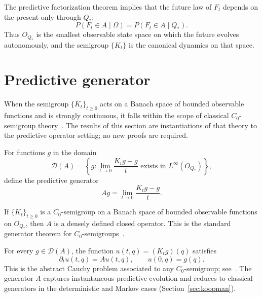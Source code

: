 \begin{remark}
The predictive factorization theorem implies that the future law of
$F_t$ depends on the present only through $Q_*$:
\[
P(F_t \in A \mid \Omega)
=
P(F_t \in A \mid Q_*).
\]
Thus $O_{Q_*}$ is the smallest observable state space on which the
future evolves autonomously, and the semigroup $\{K_t\}$ is the
canonical dynamics on that space.
\end{remark}

\section{Predictive generator}\label{sec:generator}

When the semigroup $\{K_t\}_{t\ge0}$ acts on a Banach space of bounded
observable functions and is strongly continuous, it falls within the
scope of classical $C_0$-semigroup theory~\cite{EngelNagel2000}.  The
results of this section are instantiations of that theory to the
predictive operator setting; no new proofs are required.

\begin{definition}\label{def:generator}
For functions $g$ in the domain
\[
\mathcal D(A)
=
\left\{
g :
\lim_{t\to0} \frac{K_t g - g}{t} \text{ exists in } L^\infty(O_{Q_*})
\right\},
\]
define the predictive generator
\[
A g
=
\lim_{t\to0} \frac{K_t g - g}{t}.
\]
\end{definition}

\begin{remark}\label{rem:generator-existence}
If $\{K_t\}_{t\ge0}$ is a $C_0$-semigroup on a Banach space of
bounded observable functions on $O_{Q_*}$, then $A$ is a densely
defined closed operator.  This is the standard generator theorem for
$C_0$-semigroups~\cite[Thm~II.1.4]{EngelNagel2000}.
\end{remark}

\begin{remark}\label{rem:kolmogorov}
For every $g\in\mathcal D(A)$, the function
$u(t,q) = (K_t g)(q)$
satisfies
\[
\partial_t u(t,q) = A u(t,q),
\qquad
u(0,q)=g(q).
\]
This is the abstract Cauchy problem associated to any $C_0$-semigroup;
see~\cite[Thm~II.6.7]{EngelNagel2000}.  The generator $A$ captures
instantaneous predictive evolution and reduces to classical generators
in the deterministic and Markov cases (Section~\ref{sec:koopman}).
\end{remark}


